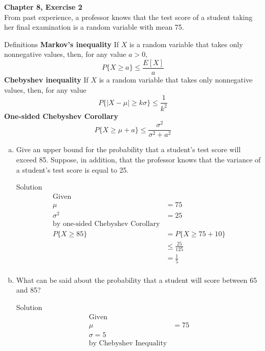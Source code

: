 \documentclass{article}
\begin{document}
\begin{spacing}{1.1}
\newpage
\begin{homeworkProblem}
  {\bf Chapter 8, Exercise 2}\\
  From past experience, a professor knows that the test score of a 
  student taking her final examination is a random variable with 
  mean 75.
  \begin{homeworkSection}{Definitions}
    {\bf Markov's inequality}
    If $X$ is a random variable that takes only nonnegative values, 
    then, for any value $a > 0$,
      \[P\{ X \ge a\} \le \frac{ E[ X]}{ a}\]
    {\bf Chebyshev inequality}
    If $X$ is a random variable that takes only nonnegative values, 
    then, for any value
      \[P\{ |X - \mu| \ge k \sigma \} \le \frac{ 1}{ k^2}\]
    {\bf One-sided Chebyshev Corollary}
      \[P\{ X \ge \mu + a\} \le \frac{ \sigma^2}{ \sigma^2 + a^2}\]
  \end{homeworkSection}
  \begin{enumerate}[(a)]
    \item Give an upper bound for the probability that a student's 
    test score will exceed 85. 
    Suppose, in addition, that the professor knows that the variance 
    of a student's test score is equal to 25.
      \begin{homeworkSection}{Solution}
        \begin{align*}
          \text{Given}\\
          \mu &= 75\\
          \sigma^2 &= 25\\
          \text{by one-sided Chebyshev Corollary}\\
          P\{ X \ge 85\} &= P\{ X \ge 75 + 10\}\\
          &\le \frac{ 25}{ 125}\\
          &= \frac{ 1}{ 5}\\
        \end{align*}
      \end{homeworkSection}
    \item What can be said about the probability that a student 
    will score between 65 and 85?
      \begin{homeworkSection}{Solution}
        \begin{align*}
          \text{Given}\\
          \mu &= 75\\
          \sigma = 5\\
          \text{by Chebyshev Inequality}\\

\end{align*}
\end{homeworkSection}
\end{enumerate}
\end{homeworkProblem}
\end{spacing}
\end{document}
